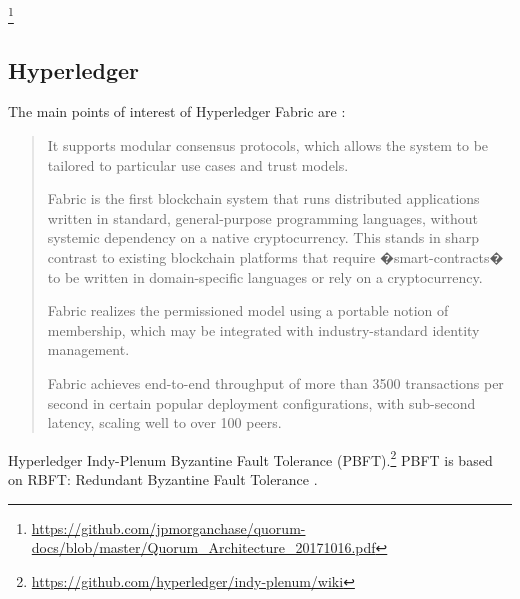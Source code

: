 \footnote{\url{https://github.com/jpmorganchase/quorum-docs/blob/master/Quorum_Architecture_20171016.pdf}}



\subsection{Hyperledger}
The main points of interest of Hyperledger Fabric are \cite{AndroulakiEtAl2018}:

\begin{quote}
\begin{packed_item1}
\item It supports modular consensus protocols, which allows the system to be tailored to particular use cases and trust models.
\item Fabric is the first blockchain system that runs distributed applications written in standard, general-purpose programming languages, without systemic dependency on a native cryptocurrency. This stands in sharp contrast to existing blockchain platforms that require �smart-contracts� to be written in domain-specific languages or rely on a cryptocurrency.
\item Fabric realizes the permissioned model using a portable notion of membership, which may be integrated with industry-standard identity management.
\item Fabric achieves end-to-end throughput of more than 3500 transactions per second in certain popular deployment configurations, with sub-second latency, scaling well to over 100 peers.
\end{packed_item1}
\end{quote}



Hyperledger Indy-Plenum Byzantine Fault Tolerance (PBFT).\footnote{\url{https://github.com/hyperledger/indy-plenum/wiki}} PBFT is based on RBFT: Redundant Byzantine Fault Tolerance
\cite{Aublinetal2013}.











